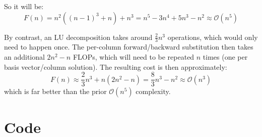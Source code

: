 \documentclass[11pt]{report}
\theoremstyle{definition}
\begin{document}
So it will be:
\[F(n) = n^2((n-1)^3+n)+n^3 = n^5-3n^4+5n^3-n^2 \approx \mathcal{O}(n^5)\]

By contrast, an LU decomposition takes around $\frac{2}{3}n^3$
operations\cite{lu_wikipedia}, which would only need to happen once. The
per-column forward/backward substitution then takes an additional $2n^2-n$
FLOPs, which will need to be repeated $n$ times (one per basis vector/column
solution). The resulting cost is then approximately:
\[F(n) \approx \frac{2}{3}n^3+n(2n^2-n) = \frac{8}{3}n^3-n^2\approx \mathcal{O}(n^3)\]
which is far better than the prior $\mathcal{O}(n^5)$ complexity.


\newpage

\section*{Code}

\lstset{style=mystyle}

\printbibliography
\end{document}
